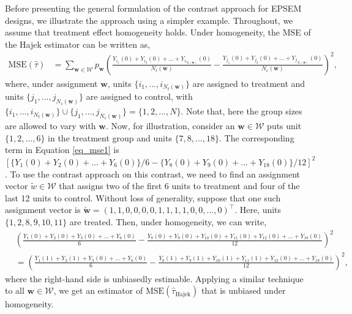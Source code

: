 \documentclass[12pt]{article}
\begin{document}
Before presenting the general formulation of the contrast approach for EPSEM designs, we illustrate the approach using a simpler example. Throughout, we assume that treatment effect homogeneity holds.
Under homogeneity, the MSE of the Hajek estimator can be written as,
\begin{align}
\text{MSE}(\hat{\tau}) & = \sum_{\bm{w} \in \mathcal{W}} p_{\bm{w}} \left(\frac{Y_{i_1}(0) + Y_{i_2}(0) + ... + Y_{i_{N_t(\bm{w})}}(0)}{N_t(\bm{w})} - \frac{Y_{j_1}(0) + Y_{j_2}(0) + ... + Y_{j_{N_c(\bm{w})}}(0)}{N_c(\bm{w})} \right)^2, \label{eq_mse1}
\end{align}
where, under assignment $\bm{w}$, units $\{i_1,...,i_{N_t(\bm{w})}\}$ are assigned to treatment and units $\{j_1,...,j_{N_c(\bm{w})}\}$ are assigned to control, with $\{i_1,...,i_{N_t(\bm{w})}\} \cup \{j_1,...,j_{N_c(\bm{w})}\} = \{1,2,...,N\}$. Note that, here the group sizes are allowed to vary with $\bm{w}$. 
Now, for illustration, consider an $\bm{w}\in \mathcal{W}$ puts unit $\{1,2,...,6\}$ in the treatment group and units $\{7,8,...,18\}$. The corresponding term in Equation \ref{eq_mse1} is $[\{Y_{1}(0) + Y_{2}(0) + ... + Y_{6}(0)\}/6 - \{Y_{8}(0) + Y_{9}(0) + ... + Y_{18}(0)\}/{12}]^2$.
To use the contrast approach on this contrast, we need to find an assignment vector $\tilde{w} \in \mathcal{W}$ that assigns two of the first 6 units to treatment and four of the last 12 units to control. Without loss of generality, suppose that one such assignment vector is $\tilde{\bm{w}} = (1,1,0,0,0,0,1,1,1,1,0,0,...,0)^\top$. Here, units $\{1,2,8,9,10,11\}$ are treated. Then, under homogeneity, we can write,
\begin{align}
  &  \left(\frac{Y_{1}(0) + Y_{2}(0) + Y_{3}(0) + ... + Y_{6}(0)}{6} - \frac{Y_{8}(0) + Y_{9}(0) + Y_{10}(0) + Y_{11}(0) + Y_{12}(0)+... + Y_{18}(0)}{12} \right)^2  \nonumber \\
  & = \left(\frac{Y_{1}(1) + Y_{2}(1) + Y_{3}(0) + ... + Y_{6}(0)}{6} - \frac{Y_{8}(1) + Y_{9}(1) + Y_{10}(1) + Y_{11}(1) + Y_{12}(0) + ... + Y_{18}(0)}{12} \right)^2,
\end{align}
where the right-hand side is unbiasedly estimable. Applying a similar technique to all $\bm{w} \in \mathcal{W}$, we get an estimator of $\text{MSE}(\hat{\tau}_{\text{Hajek}})$ that is unbiased under homogeneity. 
\end{document}
